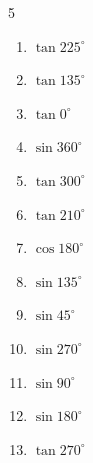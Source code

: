 \begin{multicols}{5}
\begin{enumerate}
        \phantom{$\displaystyle =0$}

  \item $\displaystyle \tan{225^\circ}$

        \phantom{$\displaystyle =1$}

  \item $\displaystyle \tan{135^\circ}$

        \phantom{$\displaystyle =-1$}

  \item $\displaystyle \tan{0^\circ}$

        \phantom{$\displaystyle =0$}

  \item $\displaystyle \sin{360^\circ}$

        \phantom{$\displaystyle =0$}

  \item $\displaystyle \tan{300^\circ}$


  \item $\displaystyle \tan{210^\circ}$


\columnbreak %

  \item $\displaystyle \cos{180^\circ}$

        \phantom{$\displaystyle =-1$}

  \item $\displaystyle \sin{135^\circ}$


  \item $\displaystyle \sin{45^\circ}$


  \item $\displaystyle \sin{270^\circ}$

        \phantom{$\displaystyle =-1$}

  \item $\displaystyle \sin{90^\circ}$

        \phantom{$\displaystyle =1$}

  \item $\displaystyle \sin{180^\circ}$

        \phantom{$\displaystyle =0$}

  \item $\displaystyle \tan{270^\circ}$


\end{enumerate}
\end{multicols}
